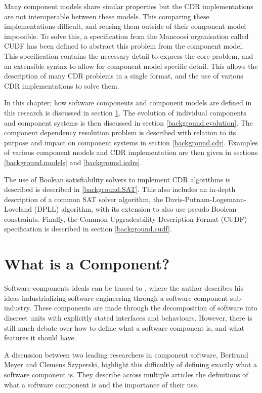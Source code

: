 Many component models share similar properties but the CDR implementations are not interoperable between these models.
This comparing these implementations difficult, and reusing them outside of their component model impossible. 
To solve this, a specification from the Mancoosi organisation called CUDF has been defined to abstract this problem from the component model.
This specification contains the necessary detail to express the core problem, and an extensible syntax to allow for component model specific detail. 
This allows the description of many CDR problems in a single format, and the use of various CDR implementations to solve them. 

In this chapter; how software components and component models are defined in this research is discussed in section \ref{background.components}.
The evolution of individual components and component systems is then discussed in section \ref{background.evolution}.
The component dependency resolution problem is described with relation to its purpose and impact on component systems in section \ref{background.cdr}.
Examples of various component models and CDR implementation are then given in sections \ref{background.models} and \ref{background.icdrs}.

The use of Boolean satisfiability solvers to implement CDR algorithms is described is described in \ref{background.SAT}.
This also includes an in-depth description of  a common SAT solver algorithm, the Davis-Putnam-Logemann-Loveland (DPLL) algorithm, 
with its extension to also use pseudo Boolean constraints.
Finally, the Common Upgradeability Description Format (CUDF) specification is described in section \ref{background.cudf}.
 
\section{What is a Component?}
\label{background.components}
Software components ideals can be traced to \cite{McIlroy1969}, where the author describes his ideas industrializing software engineering through a software component sub-industry. 
These components are made through the decomposition of software into discreet units with explicitly stated interfaces and behaviours.
However, there is still much debate over how to define what a software component is, and what features it should have.

A discussion between two leading researchers in component software, Bertrand Meyer and Clemens Szyperski, highlight this difficultly of defining exactly what a software component is. 
They describe across multiple articles \cite{Meyer1999,Szyperski2000a, Szyperski2000, Meyer2000,} the definitions of what a software component is and the importance of their use.

